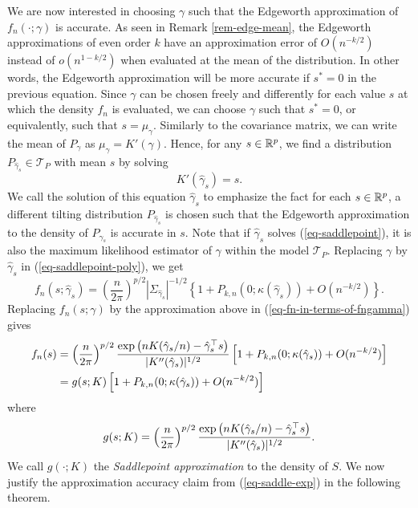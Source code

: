 We are now interested in choosing $\gamma$ such that the Edgeworth approximation of $f_n(\cdot; \gamma)$ is accurate. As seen in Remark \ref{rem-edge-mean}, the Edgeworth approximations of even order $k$ have an approximation error of $O(n^{-k/2})$ instead of $o(n^{1-k/2})$ when evaluated at the mean of the distribution. In other words, the Edgeworth approximation will be more accurate if $s^* = 0$ in the previous equation. Since $\gamma$ can be chosen freely and differently for each value $s$ at which the density $f_n$ is evaluated, we can choose $\gamma$ such that $s^* = 0$, or equivalently, such that $s = \mu_\gamma$. Similarly to the covariance matrix, we can write the mean of $P_\gamma$ as $\mu_\gamma = K'(\gamma)$. Hence, for any $s \in {\mathbb{R}^p}$, we find a distribution $P_{\hat\gamma_s} \in \mathcal{T}_P$ with mean $s$ by solving
\begin{equation} \label{eq-saddlepoint}
    K'(\hat\gamma_s) = s.
\end{equation}
We call the solution of this equation $\hat\gamma_s$ to emphasize the fact for each $s \in {\mathbb{R}^p}$, a different tilting distribution $P_{\hat\gamma_s}$ is chosen such that the Edgeworth approximation to the density of $P_{\hat\gamma_s}$ is accurate in $s$. Note that if $\hat\gamma_s$ solves (\ref{eq-saddlepoint}), it is also the maximum likelihood estimator of $\gamma$ within the model $\mathcal{T}_P$. Replacing $\gamma$ by $\hat\gamma_{s}$ in (\ref{eq-saddlepoint-poly}), we get
\begin{equation*}
    f_n(s; \hat\gamma_s) = \left(\frac{n}{2\pi}\right)^{p/2}|\Sigma_{\hat\gamma_s}|^{-1/2}\left\{ 1 + P_{k, n}(0; \kappa(\hat\gamma_s)) + O(n^{-k/2})\right\}.
\end{equation*}
Replacing $f_n(s; \gamma)$ by the approximation above in (\ref{eq-fn-in-terms-of-fngamma}) gives
\begin{align}
    f_n(s) &= \left(\frac{n}{2\pi}\right)^{p/2} \frac{\exp\left(nK(\hat\gamma_s / n) - \hat\gamma_s^\top s\right)}{|K''(\hat\gamma_s)|^{1/2}}  \left[1 + P_{k, n}(0; \kappa(\hat\gamma_s)) + O(n^{-k/2})\right]\nonumber\\
    &= g(s; K)\left[1 + P_{k, n}(0; \kappa(\hat\gamma_s)) + O(n^{-k/2})\right] \label{eq-saddle-exp}
\end{align}
where
\begin{equation*}
    g(s; K) = \left(\frac{n}{2\pi}\right)^{p/2} \frac{\exp\left(nK(\hat\gamma_s / n) - \hat\gamma_s^\top s\right)}{|K''(\hat\gamma_s)|^{1/2}}.
\end{equation*}
We call $g(\cdot; K)$ the \textit{Saddlepoint approximation} to the density of $S$. We now justify the approximation accuracy claim from (\ref{eq-saddle-exp}) in the following theorem.

